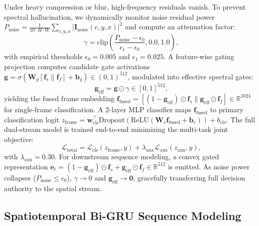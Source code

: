 \documentclass[10pt,twocolumn,letterpaper]{article}
\begin{document}
Under heavy compression or blur, high-frequency residuals vanish. To prevent spectral hallucination, we dynamically monitor noise residual power $P_{\mathrm{noise}} = \frac{1}{10 \cdot H \cdot W} \sum_{c, y, x} |\mathbf{I}_{\mathrm{noise}}(c, y, x)|^2$ and compute an attenuation factor:
\begin{equation}
\label{eq:snr_attenuation}
\gamma = \mathrm{clip}\left( \frac{P_{\mathrm{noise}} - \epsilon_0}{\epsilon_1 - \epsilon_0}, 0.0, 1.0 \right),
\end{equation}
with empirical thresholds $\epsilon_0 = 0.005$ and $\epsilon_1 = 0.025$. A feature-wise gating projection computes candidate gate activations $\mathbf{g} = \sigma(\mathbf{W}_g [\mathbf{f}_s \parallel \mathbf{f}_f] + \mathbf{b}_g) \in (0, 1)^{512}$, modulated into effective spectral gates:
\begin{equation}
\label{eq:g_effective}
\mathbf{g}_{\mathrm{eff}} = \mathbf{g} \odot \gamma \in [0, 1]^{512},
\end{equation}
yielding the fused frame embedding $\mathbf{f}_{\mathrm{fused}} = [(1 - \mathbf{g}_{\mathrm{eff}}) \odot \mathbf{f}_s \parallel \mathbf{g}_{\mathrm{eff}} \odot \mathbf{f}_f] \in \mathbb{R}^{1024}$ for single-frame classification. A 2-layer MLP classifier maps $\mathbf{f}_{\mathrm{fused}}$ to primary classification logit $z_{\mathrm{frame}} = \mathbf{w}_{\mathrm{cls}}^\top \mathrm{Dropout}(\mathrm{ReLU}(\mathbf{W}_c \mathbf{f}_{\mathrm{fused}} + \mathbf{b}_c)) + b_{\mathrm{cls}}$. The full dual-stream model is trained end-to-end minimizing the multi-task joint objective:
\begin{equation}
\label{eq:total_loss}
\mathcal{L}_{\mathrm{total}} = \mathcal{L}_{\mathrm{cls}}(z_{\mathrm{frame}}, y) + \lambda_{\mathrm{aux}} \mathcal{L}_{\mathrm{aux}}(z_{\mathrm{aux}}, y),
\end{equation}
with $\lambda_{\mathrm{aux}} = 0.30$. For downstream sequence modeling, a convex gated representation $\mathbf{e}_t = (1 - \mathbf{g}_{\mathrm{eff}}) \odot \mathbf{f}_s + \mathbf{g}_{\mathrm{eff}} \odot \mathbf{f}_f \in \mathbb{R}^{512}$ is emitted. As noise power collapses ($P_{\mathrm{noise}} \le \epsilon_0$), $\gamma \to 0$ and $\mathbf{g}_{\mathrm{eff}} \to \mathbf{0}$, gracefully transferring full decision authority to the spatial stream.

\subsection{Spatiotemporal Bi-GRU Sequence \mbox{Modeling}}
\label{sec:method_temporal}
\end{document}
